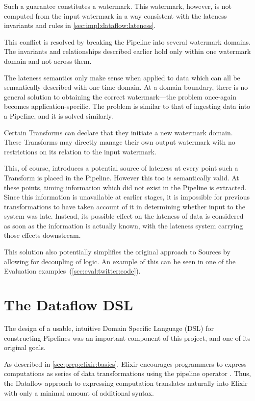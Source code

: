 Such a guarantee constitutes a watermark.
This watermark, however, is not computed from the input watermark in a way consistent with the lateness invariants and rules in \cref{sec:impl:dataflow:lateness}.

This conflict is resolved by breaking the Pipeline into several watermark domains.
The invariants and relationships described earlier hold only within one watermark domain and not across them.

The lateness semantics only make sense when applied to data which can all be semantically described with one time domain.
At a domain boundary, there is no general solution to obtaining the correct watermark---the problem once-again becomes application-specific.
The problem is similar to that of ingesting data into a Pipeline, and it is solved similarly.

Certain Transforms can declare that they initiate a new watermark domain.
These Transforms may directly manage their own output watermark with no restrictions on its relation to the input watermark.

This, of course, introduces a potential source of lateness at every point such a Transform is placed in the Pipeline.
However this too is semantically valid.
At these points, timing information which did not exist in the Pipeline is extracted.
Since this information is unavailable at earlier stages, it is impossible for previous transformations to have taken account of it in determining whether input to the system was late.
Instead, its possible effect on the lateness of data is considered as soon as the information is actually known, with the lateness system carrying those effects downstream.

This solution also potentially simplifies the original approach to Sources by allowing for decoupling of logic.
An example of this can be seen in one of the Evaluation examples~(\cref{sec:eval:twitter:code}).

\section{The Dataflow DSL}\label{sec:impl:approach}\label{sec:impl:approach:dsl}

The design of a usable, intuitive Domain Specific Language (DSL) for constructing Pipelines was an important component of this project, and one of its original goals.

As described in \cref{sec:prep:elixir:basics}, Elixir encourages programmers to express computations as series of data transformations using the pipeline operator \exs{|>}.
Thus, the Dataflow approach to expressing computation translates naturally into Elixir with only a minimal amount of additional syntax.

